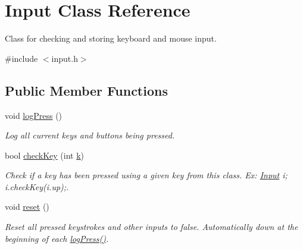 \hypertarget{classInput}{}\section{Input Class Reference}
\label{classInput}


Class for checking and storing keyboard and mouse input.  




{\ttfamily \#include $<$input.\+h$>$}

\subsection*{Public Member Functions}
\begin{DoxyCompactItemize}
\item 
void \hyperlink{classInput_a7664a52377e4bda7524d288df481954b}{log\+Press} ()\hypertarget{classInput_a7664a52377e4bda7524d288df481954b}{}\label{classInput_a7664a52377e4bda7524d288df481954b}

\begin{DoxyCompactList}\small\item\em Log all current keys and buttons being pressed. \end{DoxyCompactList}\item 
bool \hyperlink{classInput_a2f5d21366e04e3ce200fe73c6c748dd8}{check\+Key} (int \hyperlink{classInput_aa069678fdc7c45c405c044ed8e45a379}{k})\hypertarget{classInput_a2f5d21366e04e3ce200fe73c6c748dd8}{}\label{classInput_a2f5d21366e04e3ce200fe73c6c748dd8}

\begin{DoxyCompactList}\small\item\em Check if a key has been pressed using a given key from this class. Ex\+: \hyperlink{classInput}{Input} i; i.\+check\+Key(i.\+up);. \end{DoxyCompactList}\item 
void \hyperlink{classInput_a8bec96dd53baf5ec754c199af3c957c8}{reset} ()\hypertarget{classInput_a8bec96dd53baf5ec754c199af3c957c8}{}\label{classInput_a8bec96dd53baf5ec754c199af3c957c8}

\begin{DoxyCompactList}\small\item\em Reset all pressed keystrokes and other inputs to false. Automatically down at the beginning of each \hyperlink{classInput_a7664a52377e4bda7524d288df481954b}{log\+Press()}. \end{DoxyCompactList}\end{DoxyCompactItemize}
